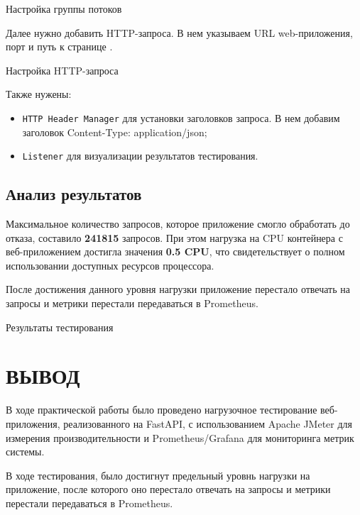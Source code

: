 \begin{image}
    \caption{Настройка группы потоков}
    \label{fig:jmeter:thread:group}
\end{image}

Далее нужно добавить HTTP-запроса. В нем указываем 
URL web-приложения, порт и путь к странице .

\begin{image}
    \caption{Настройка HTTP-запроса}
    \label{fig:jmeter:http}
\end{image}

Также нужены:

\begin{itemize}
	\item \texttt{HTTP Header Manager} для установки заголовков запроса.
		В нем добавим заголовок Content-Type: application/json;
	\item \texttt{Listener} для визуализации результатов тестирования.
\end{itemize}

\subsection{Анализ результатов}

Максимальное количество запросов, которое приложение смогло обработать
до отказа, составило \textbf{241815} запросов.
При этом нагрузка на CPU контейнера
с веб-приложением достигла значения \textbf{0.5 CPU},
что свидетельствует о полном использовании доступных ресурсов процессора.\par
После достижения данного уровня нагрузки приложение перестало отвечать
на запросы и метрики перестали передаваться в Prometheus.

\begin{image}
    \caption{Результаты тестирования}
    \label{fig:run}
\end{image}

\clearpage

\section*{\LARGE ВЫВОД}

В ходе практической работы было проведено нагрузочное тестирование
веб-приложения, реализованного на FastAPI,
с использованием Apache JMeter для измерения производительности
и Prometheus/Grafana для мониторинга метрик системы.\par
В ходе тестирования, было достигнут предельный уровнь нагрузки на приложение,
после которого оно перестало отвечать на запросы
и метрики перестали передаваться в Prometheus.

